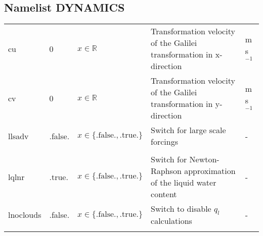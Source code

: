 \documentclass[twoside,11pt,fleqn,a4paper,english,openright]{report}
\begin{document}
\newpage
\subsection{Namelist DYNAMICS}\label{par:dynamics}
\begin{center}
  \tablelasttail{
        &&&&\\\hline
  }
\begin{supertabular}{|l|p{1.6cm}|p{4cm}|p{6cm}|l|}
  cu		& 0		& $x \in \mathbb{R}$	& Transformation velocity of the Galilei transformation in x-direction	& m s$^{-1}$\\
  cv		& 0		& $x \in \mathbb{R}$	& Transformation velocity of the Galilei transformation in y-direction	& m s$^{-1}$\\
  llsadv	& .false.	& $x\in\{\text{.false.},\text{.true.}\}$		& Switch for large scale forcings			& -\\
	 &&&&\\
  lqlnr		& .true.	& $x\in\{\text{.false.},\text{.true.}\}$		& Switch for Newton-Raphson approximation of the liquid water content	& -\\
  lnoclouds	& .false.	& $x\in\{\text{.false.},\text{.true.}\}$		& Switch to disable $q_l$ calculations	& -\\
  \qquad	&		&				&							&\\

\end{supertabular}
\end{center}
\end{document}

